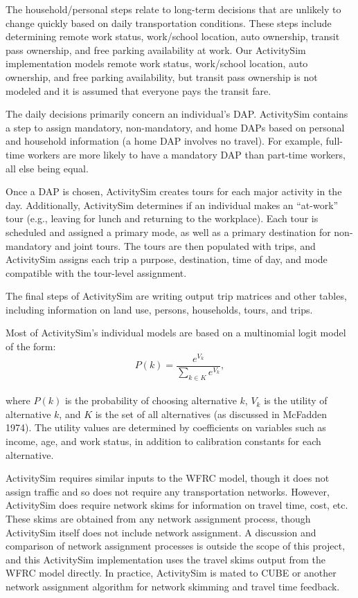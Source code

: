 \documentclass[fancy, twoside, mastersfancy, ms]{byuthesis}
\begin{document}
The household/personal steps relate to long-term decisions that are
unlikely to change quickly based on daily transportation conditions.
These steps include determining remote work status, work/school
location, auto ownership, transit pass ownership, and free parking
availability at work. Our ActivitySim implementation models remote work
status, work/school location, auto ownership, and free parking
availability, but transit pass ownership is not modeled and it is
assumed that everyone pays the transit fare.

The daily decisions primarily concern an individual's DAP. ActivitySim
contains a step to assign mandatory, non-mandatory, and home DAPs based
on personal and household information (a home DAP involves no travel).
For example, full-time workers are more likely to have a mandatory DAP
than part-time workers, all else being equal.

Once a DAP is chosen, ActivitySim creates tours for each major activity
in the day. Additionally, ActivitySim determines if an individual makes
an ``at-work'' tour (e.g., leaving for lunch and returning to the
workplace). Each tour is scheduled and assigned a primary mode, as well
as a primary destination for non-mandatory and joint tours. The tours
are then populated with trips, and ActivitySim assigns each trip a
purpose, destination, time of day, and mode compatible with the
tour-level assignment.

The final steps of ActivitySim are writing output trip matrices and
other tables, including information on land use, persons, households,
tours, and trips.

Most of ActivitySim's individual models are based on a multinomial logit
model of the form:\\
\[
P(k) = \frac{e^{V_k}}{\displaystyle \sum_{k \in K} e^{V_k}},
\]\\
where \(P(k)\) is the probability of choosing alternative \(k\), \(V_k\)
is the utility of alternative \(k\), and \(K\) is the set of all
alternatives (as discussed in McFadden 1974). The utility values are
determined by coefficients on variables such as income, age, and work
status, in addition to calibration constants for each alternative.

ActivitySim requires similar inputs to the WFRC model, though it does
not assign traffic and so does not require any transportation networks.
However, ActivitySim does require network skims for information on
travel time, cost, etc. These skims are obtained from any network
assignment process, though ActivitySim itself does not include network
assignment. A discussion and comparison of network assignment processes
is outside the scope of this project, and this ActivitySim
implementation uses the travel skims output from the WFRC model
directly. In practice, ActivitySim is mated to CUBE or another network
assignment algorithm for network skimming and travel time feedback.
\end{document}
